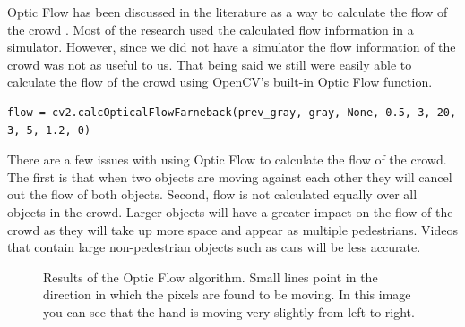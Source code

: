 \documentclass[12pt, onecolumn, conference]{IEEEtran}
\begin{document}
Optic Flow has been discussed in the literature as a way to calculate the flow of the crowd \cite{N. Courty}\cite{B. Boghossian}\cite{R. Mehran}. Most of the research used the calculated flow information in a simulator. However, since we did not have a simulator the flow information of the crowd was not as useful to us. That being said we still were easily able to calculate the flow of the crowd using OpenCV’s built-in Optic Flow function. \\

\begin{lstlisting}
flow = cv2.calcOpticalFlowFarneback(prev_gray, gray, None, 0.5, 3, 20, 3, 5, 1.2, 0)
\end{lstlisting}

There are a few issues with using Optic Flow to calculate the flow of the crowd. The first is that when two objects are moving against each other they will cancel out the flow of both objects. Second, flow is not calculated equally over all objects in the crowd. Larger objects will have a greater impact on the flow of the crowd as they will take up more space and appear as multiple pedestrians. Videos that contain large non-pedestrian objects such as cars will be less accurate.

\begin{figure}[!t]
\centering
{}
\hfil
{}
\caption{Results of the Optic Flow algorithm. Small lines point in the direction in which the pixels are found to be moving. In this image you can see that the hand is moving very slightly from left to right.}
\label{Optic_Flow}
\end{figure}
\end{document}

